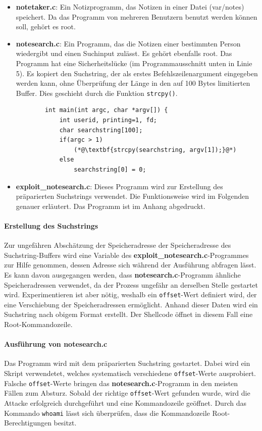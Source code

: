 \documentclass[11pt, a4paper]{article}
\begin{document}
\begin{itemize}
	\item \textbf{notetaker.c}: Ein Notizprogramm, das Notizen in einer Datei (var/notes) speichert. Da das Programm von mehreren Benutzern benutzt werden können soll, gehört es root.
	\item \textbf{notesearch.c}: Ein Programm, das die Notizen einer bestimmten Person wiedergibt und einen Suchinput zulässt. Es gehört ebenfalls root. Das Programm hat eine Sicherheitslücke (im Programmausschnitt unten in Linie 5). Es kopiert den Suchstring, der als erstes Befehlszeilenargument eingegeben werden kann, ohne Überprüfung der Länge in den auf 100 Bytes limitierten Buffer. Dies geschieht durch die Funktion \texttt{strcpy()}.
	\begin{lstlisting}
		int main(int argc, char *argv[]) {
			int userid, printing=1, fd;
			char searchstring[100];
			if(argc > 1)
				(*@\textbf{strcpy(searchstring, argv[1]);}@*)
			else
				searchstring[0] = 0;
		\end{lstlisting}
	\item \textbf{exploit\_notesearch.c}: Dieses Programm wird zur Erstellung des präparierten Suchstrings verwendet. Die Funktionsweise wird im Folgenden genauer erläutert. Das Programm ist im Anhang abgedruckt.
\end{itemize}

\paragraph{Erstellung des Suchstrings}
Zur ungefähren Abschätzung der Speicheradresse der Speicheradresse des Suchstring-Buffers wird eine Variable des \textbf{exploit\_notesearch.c}-Programmes zur Hilfe genommen, dessen Adresse sich während der Ausführung abfragen lässt. Es kann davon ausgegangen werden, dass \textbf{notesearch.c}-Programm ähnliche Speicheradressen verwendet, da der Prozess ungefähr an derselben Stelle gestartet wird. Experimentieren ist aber nötig, weshalb ein \texttt{offset}-Wert definiert wird, der eine Verschiebung der Speicheradressen ermöglicht. Anhand dieser Daten wird ein Suchstring nach obigem Format erstellt. Der Shellcode öffnet in diesem Fall eine Root-Kommandozeile.

\paragraph{Ausführung von notesearch.c}
Das Programm wird mit dem präparierten Suchstring gestartet. Dabei wird ein Skript verwendetet, welches systematisch verschiedene \texttt{offset}-Werte ausprobiert. Falsche \texttt{offset}-Werte bringen das \textbf{notesearch.c}-Programm in den meisten Fällen zum Absturz. Sobald der richtige \texttt{offset}-Wert gefunden wurde, wird die Attacke erfolgreich durchgeführt und eine Kommandozeile geöffnet. Durch das Kommando \texttt{whoami} lässt sich überprüfen, dass die Kommandozeile Root-Berechtigungen besitzt. 
\end{document}
